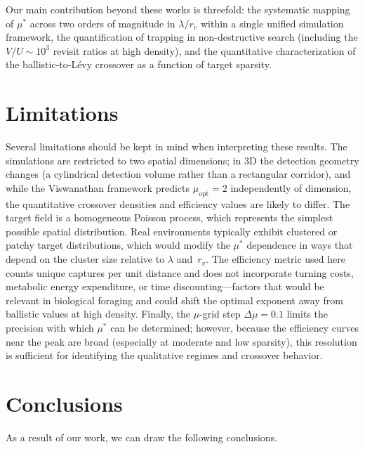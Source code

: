 Our main contribution beyond these works is threefold: the systematic mapping of $\mu^*$ across two orders of magnitude in $\lambda/r_v$ within a single unified simulation framework, the quantification of trapping in non-destructive search (including the $V/U \sim 10^3$ revisit ratios at high density), and the quantitative characterization of the ballistic-to-L\'evy crossover as a function of target sparsity.

\section{Limitations}

Several limitations should be kept in mind when interpreting these results. The simulations are restricted to two spatial dimensions; in 3D the detection geometry changes (a cylindrical detection volume rather than a rectangular corridor), and while the Viswanathan framework predicts $\mu_{\mathrm{opt}} = 2$ independently of dimension, the quantitative crossover densities and efficiency values are likely to differ. The target field is a homogeneous Poisson process, which represents the simplest possible spatial distribution. Real environments typically exhibit clustered or patchy target distributions, which would modify the $\mu^*$ dependence in ways that depend on the cluster size relative to $\lambda$ and~$r_v$. The efficiency metric used here counts unique captures per unit distance and does not incorporate turning costs, metabolic energy expenditure, or time discounting---factors that would be relevant in biological foraging and could shift the optimal exponent away from ballistic values at high density. Finally, the $\mu$-grid step $\Delta\mu = 0.1$ limits the precision with which $\mu^*$ can be determined; however, because the efficiency curves near the peak are broad (especially at moderate and low sparsity), this resolution is sufficient for identifying the qualitative regimes and crossover behavior.

\section{Conclusions}

As a result of our work, we can draw the following conclusions.

